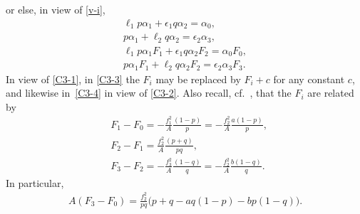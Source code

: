 \documentclass[10pt,a4paper]{amsart}
\numberwithin{equation}{section}
\begin{document}
or else, in view of \eqref{v-i},
\begin{gather} \ell _1 p \alpha _1 + \epsilon _1 q \alpha _2 = \alpha _0, \label{C3-1}\\
 p \alpha _1 + \ell _2 q \alpha _2 = \epsilon _2 \alpha _3,\label{C3-2} \\
 \ell _1 p \alpha _1 F_1 + \epsilon _1 q \alpha _2 F_2 = \alpha _0 F_0, \label{C3-3}\\
 p \alpha _1 F_1 + \ell _2 q \alpha _2 F_2 = \epsilon _2 \alpha _3 F_3. \label{C3-4}\end{gather}
In view of \eqref{C3-1}, in \eqref{C3-3} the $F_i$ may be replaced by $F_i + c$ for any constant $c$, and likewise in~\eqref{C3-4} in view of \eqref{C3-2}. Also recall, cf.\ \cite[Proposition 7.3]{BG}, that the $F_i$ are related by
\begin{align}
& F_1 - F_0 = - \frac{f_1 ^2}{A} \frac{(1 - p)}{p} = - \frac{f_2 ^2}{A} \frac{a (1 - p)}{p},\nonumber
\\& F_2 - F_1 = \frac{f_2^2}{A} \frac{(p + q)}{p q},\nonumber \\&
F_3 - F _2 = - \frac{f_3 ^2}{A} \frac{(1 - q)}{q} = - \frac{f_2^2}{A} \frac{b (1 - q)}{q}. \label{F-F} \end{align}
In particular,
\begin{gather} \label{F3-F0} A (F_3 - F _0) = \frac{f_2 ^2}{p q} \big(p + q - a q (1 - p) - b p (1 - q)\big). \end{gather}
\end{document}
